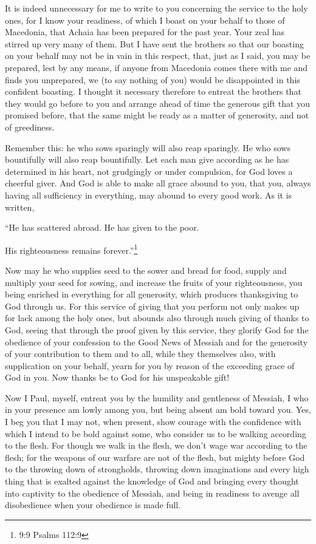 \mychapter{} \myverse*{}It is indeed unnecessary for me to write to you concerning the
service to the holy ones,
\myverse{}for I know your readiness, of which I boast on your behalf to those of Macedonia,
that Achaia has been prepared for the past year. Your zeal has stirred up very many of them.
\myverse{}But I have sent the brothers so that our boasting on your behalf may not be
in vain in this respect, that, just as I said, you may be prepared,
\myverse{}lest by any means, if anyone from Macedonia comes there with me and finds you
unprepared, we (to say nothing of you) would be disappointed in this confident boasting.
\myverse{}I thought it necessary therefore to entreat the brothers that they would go
before to you and arrange ahead of time the generous gift that you promised before, that the same might
be ready as a matter of generosity, and not of greediness.

\myverse{}Remember this: he who sows sparingly will also reap sparingly.
He who sows bountifully will also reap bountifully.
\myverse{}Let each man give according as he has determined in his heart, not grudgingly
or under compulsion, for God loves a cheerful giver.
\myverse{}And God is able to make all grace abound to you, that you, always having all
sufficiency in everything, may abound to every good work.
\myverse{}As it is written,

“He has scattered abroad. He has given to the poor.

His righteousness remains forever.”\footnote{9:9 Psalms 112:9}

\myverse{}Now may he who supplies seed to the sower and bread for food,
supply and multiply your seed for sowing, and increase the fruits of your righteousness,
\myverse{}you being enriched in everything for all generosity, which produces thanksgiving
to God through us.
\myverse{}For this service of giving that you perform not only makes up for lack among
the holy ones, but abounds also through much giving of thanks to God,
\myverse{}seeing that through the proof given by this service, they glorify God for
the obedience of your confession to the Good News of Messiah and for the generosity of your contribution
to them and to all,
\myverse{}while they themselves also, with supplication on your behalf, yearn for you
by reason of the exceeding grace of God in you.
\myverse{}Now thanks be to God for his unspeakable gift!


\mychapter{} \myverse*{}Now I Paul, myself, entreat you by the humility and gentleness
of Messiah, I who in your presence am lowly among you, but being absent am bold toward you.
\myverse{}Yes, I beg you that I may not, when present, show courage with the confidence
with which I intend to be bold against some, who consider us to be walking according to the flesh.
\myverse{}For though we walk in the flesh, we don’t wage war according to the flesh;
\myverse{}for the weapons of our warfare are not of the flesh, but mighty before God
to the throwing down of strongholds,
\myverse{}throwing down imaginations and every high thing that is exalted against the
knowledge of God and bringing every thought into captivity to the obedience of Messiah,
\myverse{}and being in readiness to avenge all disobedience when your obedience is made
full.

